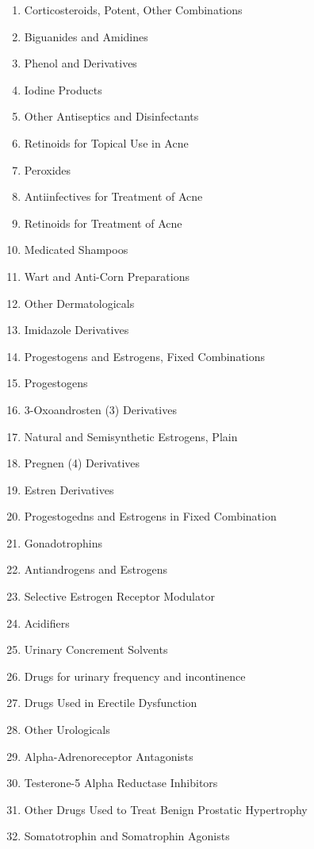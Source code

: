 \documentclass[a4paper,12pt]{article}
\begin{document}
\begin{appendices}
\begin{enumerate}
   			\item Corticosteroids, Potent, Other Combinations
   			\item Biguanides and Amidines
   			\item Phenol and Derivatives
   			\item Iodine Products
   			\item Other Antiseptics and Disinfectants
   			\item Retinoids for Topical Use in Acne
   			\item Peroxides
   			\item Antiinfectives for Treatment of Acne
   			\item Retinoids for Treatment of Acne
   			\item Medicated Shampoos
   			\item Wart and Anti-Corn Preparations
   			\item Other Dermatologicals
   			\item Imidazole Derivatives
   			\item Progestogens and Estrogens, Fixed Combinations
   			\item Progestogens
   			\item 3-Oxoandrosten (3) Derivatives
   			\item Natural and Semisynthetic Estrogens, Plain
   			\item Pregnen (4) Derivatives
   			\item Estren Derivatives
   			\item Progestogedns and Estrogens in Fixed Combination
   			\item Gonadotrophins
   			\item Antiandrogens and Estrogens
   			\item Selective Estrogen Receptor Modulator
   			\item Acidifiers
   			\item Urinary Concrement Solvents
   			\item Drugs for urinary frequency and incontinence
   			\item Drugs Used in Erectile Dysfunction
   			\item Other Urologicals
   			\item Alpha-Adrenoreceptor Antagonists
   			\item Testerone-5 Alpha Reductase Inhibitors
   			\item Other Drugs Used to Treat Benign Prostatic Hypertrophy
   			\item Somatotrophin and Somatrophin Agonists

\end{enumerate}
\end{appendices}
\end{document}
